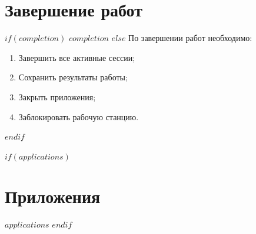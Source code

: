 \documentclass[14pt,a4paper]{extarticle}
\begin{document}
\section{Завершение работ}
\label{sec:completion}

$if(completion)$
$completion$
$else$
По завершении работ необходимо:
\begin{enumerate}
    \item Завершить все активные сессии;
    \item Сохранить результаты работы;
    \item Закрыть приложения;
    \item Заблокировать рабочую станцию.
\end{enumerate}
$endif$

$if(applications)$
\newpage
\appendix
\section*{Приложения}
$applications$
$endif$
\end{document}
